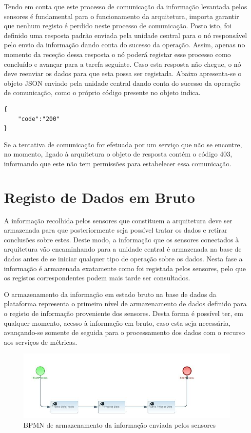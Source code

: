 Tendo em conta que este processo de comunicação da informação levantada pelos sensores é fundamental para o funcionamento da arquitetura, importa garantir que nenhum registo é perdido neste processo de comunicação. Posto isto, foi definido uma resposta padrão enviada pela unidade central para o nó responsável pelo envio da informação dando conta do sucesso da operação. Assim, apenas no momento da receção dessa resposta o nó poderá registar esse processo como concluído e avançar para a tarefa seguinte. Caso esta resposta não chegue, o nó deve reenviar os dados para que esta possa ser registada. Abaixo apresenta-se o objeto JSON enviado pela unidade central dando conta do sucesso da operação de comunicação, como o próprio código presente no objeto indica.\\

\begin{lstlisting}[caption=Mensagem de sucesso em JSON]
{
	"code":"200"
}
\end{lstlisting}


Se a tentativa de comunicação for efetuada por um serviço que não se encontre, no momento, ligado à arquitetura o objeto de resposta contém o código 403, informando que este não tem permissões para estabelecer essa comunicação.


\section{Registo de Dados em Bruto}

A informação recolhida pelos sensores que constituem a arquitetura deve ser armazenada para que posteriormente seja possível tratar os dados e retirar conclusões sobre estes. Deste modo, a informação que os sensores conectados à arquitetura vão encaminhando para a unidade central é armazenada na base de dados antes de se iniciar qualquer tipo de operação sobre os dados. Nesta fase a informação é armazenada exatamente como foi registada pelos sensores, pelo que os registos correspondentes podem mais tarde ser consultados.

O armazenamento da informação em estado bruto na base de dados da plataforma representa o primeiro nível de armazenamento de dados definido para o registo de informação proveniente dos sensores. Desta forma é possível ter, em qualquer momento, acesso à informação em bruto, caso esta seja necessária, avançando-se somente de seguida para o processamento dos dados com o recurso aos serviços de métricas. 

\begin{figure}[htb]
   \centering
   \includegraphics[scale=0.6]{Images/SaveDataComponent.jpg}
   \caption{BPMN de armazenamento da informação enviada pelos sensores}
\end{figure}

